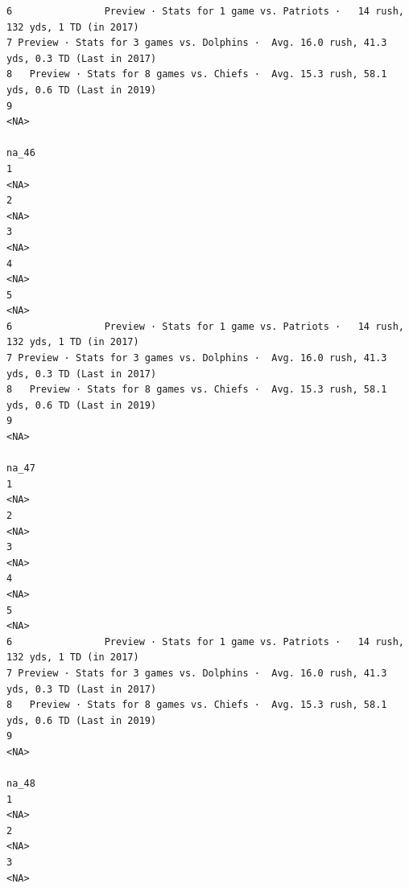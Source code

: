 \documentclass[
]{article}
\begin{document}
\begin{verbatim}
6                Preview · Stats for 1 game vs. Patriots ·   14 rush, 132 yds, 1 TD (in 2017)
7 Preview · Stats for 3 games vs. Dolphins ·  Avg. 16.0 rush, 41.3 yds, 0.3 TD (Last in 2017)
8   Preview · Stats for 8 games vs. Chiefs ·  Avg. 15.3 rush, 58.1 yds, 0.6 TD (Last in 2019)
9                                                                                        <NA>
                                                                                        na_46
1                                                                                        <NA>
2                                                                                        <NA>
3                                                                                        <NA>
4                                                                                        <NA>
5                                                                                        <NA>
6                Preview · Stats for 1 game vs. Patriots ·   14 rush, 132 yds, 1 TD (in 2017)
7 Preview · Stats for 3 games vs. Dolphins ·  Avg. 16.0 rush, 41.3 yds, 0.3 TD (Last in 2017)
8   Preview · Stats for 8 games vs. Chiefs ·  Avg. 15.3 rush, 58.1 yds, 0.6 TD (Last in 2019)
9                                                                                        <NA>
                                                                                        na_47
1                                                                                        <NA>
2                                                                                        <NA>
3                                                                                        <NA>
4                                                                                        <NA>
5                                                                                        <NA>
6                Preview · Stats for 1 game vs. Patriots ·   14 rush, 132 yds, 1 TD (in 2017)
7 Preview · Stats for 3 games vs. Dolphins ·  Avg. 16.0 rush, 41.3 yds, 0.3 TD (Last in 2017)
8   Preview · Stats for 8 games vs. Chiefs ·  Avg. 15.3 rush, 58.1 yds, 0.6 TD (Last in 2019)
9                                                                                        <NA>
                                                                                        na_48
1                                                                                        <NA>
2                                                                                        <NA>
3                                                                                        <NA>

\end{verbatim}
\end{document}
